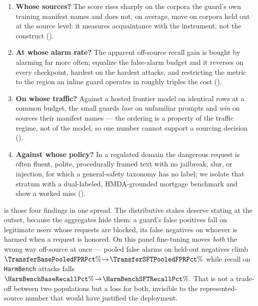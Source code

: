 \documentclass[manuscript,screen,review,anonymous]{acmart}
\newcommand{\code}[1]{\texttt{\small #1}}
\begin{document}
\begin{enumerate}[leftmargin=1.6em,itemsep=1pt]
  \item \textbf{Whose sources?} The score rises sharply on the corpora the guard's own training manifest
  names and does not, on average, move on corpora held out at the source level: it measures acquaintance
  with the instrument, not the construct ().
  \item \textbf{At whose alarm rate?} The apparent off-source recall gain is bought by alarming far more
  often; equalize the false-alarm budget and it reverses on every checkpoint, hardest on the hardest
  attacks, and restricting the metric to the region an inline guard operates in roughly triples the cost
  ().
  \item \textbf{On whose traffic?} Against a hosted frontier model on identical rows at a common budget,
  the small guards \emph{lose} on unfamiliar prompts and \emph{win} on sources their manifest names ---
  the ordering is a property of the traffic regime, not of the model, so one number cannot support a
  sourcing decision ().
  \item \textbf{Against whose policy?} In a regulated domain the dangerous request is often fluent,
  polite, procedurally framed text with no jailbreak, slur, or injection, for which a general-safety
  taxonomy has no label; we isolate that stratum with a dual-labeled, HMDA-grounded mortgage benchmark
  and show a worked miss ().
\end{enumerate}

 is those four findings in one spread. The distributive stakes deserve stating at
the outset, because the aggregates hide them: a guard's false positives fall on legitimate users whose
requests are blocked, its false negatives on whoever is harmed when a request is honored. On this panel
fine-tuning moves \emph{both} the wrong way off-source at once --- pooled false alarms on held-out
negatives climb $\TransferBasePooledFPRPct\%\!\rightarrow\!\TransferSFTPooledFPRPct\%$ while recall on
\code{HarmBench} attacks falls
$\HarmBenchBaseRecallPct\%\!\rightarrow\!\HarmBenchSFTRecallPct\%$. That is not a trade-off between two
populations but a loss for both, invisible to the represented-source number that would have justified
the deployment.
\end{document}

